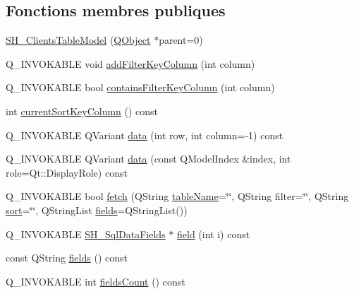 \subsection*{Fonctions membres publiques}
\begin{DoxyCompactItemize}
\item 
\hyperlink{classSH__ClientsTableModel_ac0fce2c2880ff26de22fce2abb6432a3}{S\-H\-\_\-\-Clients\-Table\-Model} (\hyperlink{classQObject}{Q\-Object} $\ast$parent=0)
\item 
Q\-\_\-\-I\-N\-V\-O\-K\-A\-B\-L\-E void \hyperlink{classSH__ExtendedProxyModel_a7b432fac5c42bf84a005f2942896ca32}{add\-Filter\-Key\-Column} (int column)
\item 
Q\-\_\-\-I\-N\-V\-O\-K\-A\-B\-L\-E bool \hyperlink{classSH__ExtendedProxyModel_a81c40d3ce9710029cae19cc65bf5419d}{contains\-Filter\-Key\-Column} (int column)
\item 
int \hyperlink{classSH__ExtendedProxyModel_adbbc1e62c72991f4ed14537cf1ba9c8f}{current\-Sort\-Key\-Column} () const 
\item 
Q\-\_\-\-I\-N\-V\-O\-K\-A\-B\-L\-E Q\-Variant \hyperlink{classSH__ExtendedProxyModel_a9fd2e16750c7c8c4cbd8f357b00ed008}{data} (int row, int column=-\/1) const 
\item 
Q\-\_\-\-I\-N\-V\-O\-K\-A\-B\-L\-E Q\-Variant \hyperlink{classSH__ExtendedProxyModel_afbc947efbe1107fc5bf8926c52902a1c}{data} (const Q\-Model\-Index \&index, int role=Qt\-::\-Display\-Role) const 
\item 
Q\-\_\-\-I\-N\-V\-O\-K\-A\-B\-L\-E bool \hyperlink{classSH__ExtendedProxyModel_a1df5323af8d29e81f22a7118227eeeb8}{fetch} (Q\-String \hyperlink{classSH__ExtendedProxyModel_abb133e196ca7cf90b9c9b57263e898d6}{table\-Name}=\char`\"{}\char`\"{}, Q\-String filter=\char`\"{}\char`\"{}, Q\-String \hyperlink{classSH__ExtendedProxyModel_a2d5fdb58bf67879e3f3130619b93104a}{sort}=\char`\"{}\char`\"{}, Q\-String\-List \hyperlink{classSH__ExtendedProxyModel_a3a69386b6070dacf320ef29e760816c1}{fields}=Q\-String\-List())
\item 
Q\-\_\-\-I\-N\-V\-O\-K\-A\-B\-L\-E \hyperlink{classSH__SqlDataFields}{S\-H\-\_\-\-Sql\-Data\-Fields} $\ast$ \hyperlink{classSH__ExtendedProxyModel_a75081819198741a532eefd5875a90678}{field} (int i) const 
\item 
const Q\-String \hyperlink{classSH__ExtendedProxyModel_a3a69386b6070dacf320ef29e760816c1}{fields} () const 
\item 
Q\-\_\-\-I\-N\-V\-O\-K\-A\-B\-L\-E int \hyperlink{classSH__ExtendedProxyModel_ab935cb0865fd2010ab35f1743adb8633}{fields\-Count} () const 

\end{DoxyCompactItemize}

